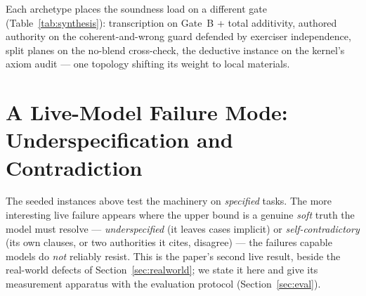 \documentclass[11pt]{article}
\begin{document}
Each archetype places the soundness load on a different gate (Table~\ref{tab:synthesis}): transcription
on Gate~B + total additivity, authored authority on the coherent-and-wrong guard defended by exerciser
independence, split planes on the no-blend cross-check, the deductive instance on the kernel's axiom
audit --- one topology shifting its weight to local materials.

\section{A Live-Model Failure Mode: Underspecification and Contradiction}
\label{sec:underspec}

The seeded instances above test the machinery on \emph{specified} tasks. The more interesting
live failure appears where the upper bound is a genuine \emph{soft} truth the model must
resolve --- \emph{underspecified} (it leaves cases implicit) or \emph{self-contradictory} (its
own clauses, or two authorities it cites, disagree) --- the failures capable models do
\emph{not} reliably resist. This is the paper's second live result, beside the real-world
defects of Section~\ref{sec:realworld}; we state it here and give its measurement apparatus with
the evaluation protocol (Section~\ref{sec:eval}).
\end{document}
